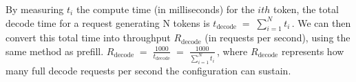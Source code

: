 
By measuring $t_i$ the compute time (in milliseconds) for the $ith$ token, the total decode time for a request generating N tokens is $t_{\text{decode}} \;=\;\sum_{i=1}^{N} t_i\,$.
We can then convert this total time into throughput $R_{\text{decode}}$ (in requests per second), using the same method as prefill.
$R_{\text{decode}}
\;=\;\frac{1000}{t_{\text{decode}}}
\;=\;\frac{1000}{\sum_{i=1}^{N} t_i}\,$,
where $R_{\text{decode}}$ represents how many full decode requests per second the configuration can sustain.

